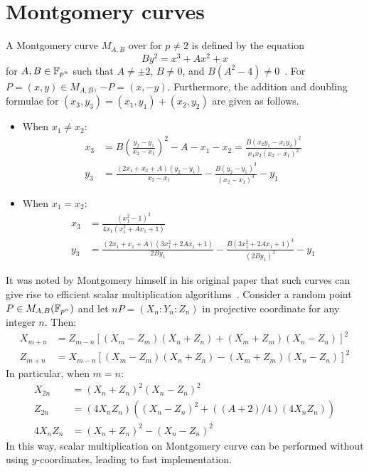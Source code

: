 %
%

\section{Montgomery curves}
\label{sec:montgomery-symmetry}
%
A Montgomery curve $M_{A,B}$ over  for $p\neq 2$ is defined by
the equation \begin{equation}
  By^2=x^3+Ax^2+x \label{eq:montgomery-curve} \end{equation} for
$A,B\in\mathbb F_{p^n}$ such that $A\neq\pm 2$, $B\neq 0$, and
$B(A^2-4)\neq 0$~\cite{1987-montgomery}.
%
For $P=(x,y)\in M_{A,B}$, $-P=(x,-y)$.
%
Furthermore, the addition and doubling formulae for
$(x_3,y_3)=(x_1,y_1)+(x_2,y_2)$ are given as follows.
%
\begin{itemize}
\item When $x_1\neq x_2$:
  \begin{align*}
    x_3 & = B\left(\frac{y_2 - y_1} {x_2 - x_1}\right)^2 - A - x_1 - x_2 = \frac{B(x_2y_1 - x_1y_2)^2} {x_1x_2(x_2 - x_1)^2} \\
    y_3 & = \frac{(2x_1 + x_2 + A)(y_2 - y_1)} {x_2 - x_1} - \frac{B(y_2 - y_1)^3} {(x_2 - x_1)^3} - y_1
  \end{align*}
\item When $x_1=x_2$:
  \begin{align*}
    x_3 & = \frac{(x_1^2 - 1)^2} {4x_1(x_1^2 + Ax_1 + 1)}  \\
    y_3 & = \frac{(2x_1 + x_1 + A)(3x_1^2 + 2Ax_1 + 1)} {2By_1} - \frac{B(3x_1^2 + 2Ax_1 + 1)^3} {(2By_1)^3} - y_1
  \end{align*}
\end{itemize}
%
It was noted by Montgomery himself in his original paper that such
curves can give rise to efficient scalar multiplication
algorithms~\cite{1987-montgomery}.
%
Consider a random point $P\in M_{A,B}(\mathbb F_{p^n})$ and let
$nP=(X_n:Y_n:Z_n)$ in projective coordinate for any integer $n$.
%
Then:
%
\begin{align*}
  X_{m+n} & = Z_{m-n}[(X_m - Z_m)(X_n + Z_n) + (X_m + Z_m)(X_n - Z_n)]^2 \\
  Z_{m+n} & = X_{m-n}[(X_m - Z_m)(X_n + Z_n) - (X_m + Z_m)(X_n - Z_n)]^2
\end{align*}
%
In particular, when $m=n$:
\begin{align*}
  X_{2n} & = (X_n + Z_n)^2(X_n - Z_n)^2 \\
  Z_{2n} & = (4X_nZ_n)\left((X_n - Z_n)^2 + ((A+2)/4)(4X_nZ_n)\right) \\
  4X_nZ_n & = ( X_n + Z_n)^2 - (X_n - Z_n)^2
\end{align*}
%
In this way, scalar multiplication on Montgomery curve can be
performed without using $y$-coordinates, leading to fast
implementation.

